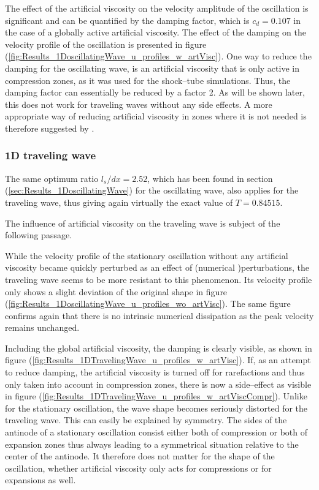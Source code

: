 \documentclass[11pt,a4paper,twoside]{report}
\begin{document}
The effect of the artificial viscosity on the velocity amplitude of the oscillation is significant and can be quantified by the damping factor, which is $c_d=0.107$ in the case of a globally active artificial viscosity. The effect of the damping on the velocity profile of the oscillation is presented in figure (\ref{fig:Results_1DoscillatingWave_u_profiles_w_artVisc}). One way to reduce the damping for the oscillating wave, is an artificial viscosity that is only active in compression zones, as it was used for the shock--tube simulations. Thus, the damping factor can essentially be reduced by a factor 2. As will be shown later, this does not work for traveling waves without any side effects. 
A more appropriate way of reducing artificial viscosity in zones where it is not needed is therefore suggested by \cite{Monaghan2005}.



\subsubsection{1D traveling wave}

The same optimum ratio $l_s/dx=2.52$, which has been found in section (\ref{sec:Results_1DoscillatingWave}) for the oscillating wave, also applies for the traveling wave, thus giving again virtually the exact value of $T=0.84515$. 

The influence of artificial viscosity on the traveling wave is subject of the following passage.

While the velocity profile of the stationary oscillation without any artificial viscosity became quickly perturbed as an effect of (numerical )perturbations, the traveling wave seems to be more resistant to this phenomenon. Its velocity profile only shows a slight deviation of the original shape in figure (\ref{fig:Results_1DoscillatingWave_u_profiles_wo_artVisc}). The same figure confirms again that there is no intrinsic numerical dissipation as the peak velocity remains unchanged.

Including the global artificial viscosity, the damping is clearly visible, as shown in figure (\ref{fig:Results_1DTravelingWave_u_profiles_w_artVisc}). If, as an attempt to reduce damping, the artificial viscosity is turned off for rarefactions and thus only taken into account in compression zones, there is now a side--effect as visible in figure (\ref{fig:Results_1DTravelingWave_u_profiles_w_artViscCompr}). Unlike for the stationary oscillation, the wave shape becomes seriously distorted for the traveling wave. This can easily be explained by symmetry. The sides of the antinode of a stationary oscillation consist either both of compression or both of expansion zones thus always leading to a symmetrical situation relative to the center of the antinode. It therefore does not matter for the shape of the oscillation, whether artificial viscosity only acts for compressions or for expansions as well.
\end{document}
